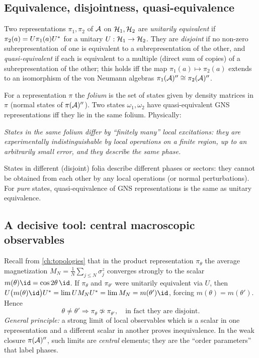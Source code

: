 \subsection{Equivalence, disjointness, quasi-equivalence}

Two representations $\pi_1,\pi_2$ of $\mathcal{A}$ on $\mathcal{H}_1,\mathcal{H}_2$ are \emph{unitarily equivalent} if $\pi_2(a)=U\pi_1(a)U^{*}$ for a unitary $U:\mathcal{H}_1\to\mathcal{H}_2$. They are \emph{disjoint} if no non-zero subrepresentation of one is equivalent to a subrepresentation of the other, and \emph{quasi-equivalent} if each is equivalent to a multiple (direct sum of copies) of a subrepresentation of the other; this holds iff the map $\pi_1(a)\mapsto\pi_2(a)$ extends to an isomorphism of the von Neumann algebras $\pi_1(\mathcal{A})''\cong\pi_2(\mathcal{A})''$.

For a representation $\pi$ the \emph{folium} is the set of states given by density matrices in $\pi$ (normal states of $\pi(\mathcal{A})''$). Two states $\omega_1,\omega_2$ have quasi-equivalent GNS representations iff they lie in the same folium. Physically:

\begin{center}
\emph{States in the same folium differ by ``finitely many'' local excitations: they are experimentally indistinguishable by local operations on a finite region, up to an arbitrarily small error, and they describe the same phase.}
\end{center}
States in different (disjoint) folia describe different phases or sectors: they cannot be obtained from each other by any local operations (or normal perturbations). For \emph{pure} states, quasi-equivalence of GNS representations is the same as unitary equivalence.

\subsection{A decisive tool: central macroscopic observables}

Recall from \cref{ch:topologies} that in the product representation $\pi_\theta$ the average magnetization $M_N=\frac1N\sum_{j\le N}\sigma^z_j$ converges strongly to the scalar $m(\theta)\id=\cos2\theta\,\id$. If $\pi_\theta$ and $\pi_{\theta'}$ were unitarily equivalent via $U$, then $U\big(m(\theta)\id\big)U\ad=\lim UM_NU\ad=\lim M_N=m(\theta')\id$, forcing $m(\theta)=m(\theta')$. Hence
\begin{equation}
\theta\ne\theta'\Longrightarrow\pi_\theta\not\simeq\pi_{\theta'},\quad\text{in fact they are disjoint.}
\end{equation}
\emph{General principle:} a strong limit of local observables which is a scalar in one representation and a different scalar in another proves inequivalence. In the weak closure $\pi(\mathcal{A})''$, such limits are \emph{central} elements; they are the ``order parameters'' that label phases.

